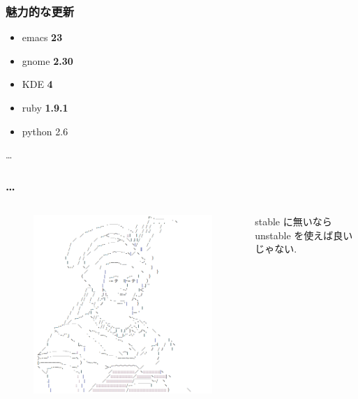 \documentclass[cjk,dvipdfmx,12pt,%
hyperref={bookmarks=true,bookmarksnumbered=true,bookmarksopen=false,%
colorlinks=false,%
pdftitle={野良ビルドから始めるパッケージ作成},%
pdfauthor={佐々木洋平},%
pdfsubject={第37回関西Debian勉強会 at OSC 2010 Kansai$@$kyoto},%
}]{beamer}
\begin{document}

\begin{frame}[fragile]
\frametitle{魅力的な更新}


\begin{itemize}
\item emacs \textbf{23}
\item gnome \textbf{2.30}
\item KDE \textbf{4}
\item ruby \textbf{1.9.1}
\item python 2.6
\end{itemize}

\dots{}

\end{frame}



\begin{frame}[fragile]
\frametitle{\dots{}}


\begin{columns}[t]
\column{0.45\paperwidth}
\begin{figure}[h!]
    \centering
    \includegraphics[width=1.05\textheight]{./image201007/AA-MarieAntoinette.png}
\end{figure}


\column{0.45\paperwidth}

\begin{center}
stable に無いなら unstable を使えば良いじゃない.
\end{center}

\end{columns}


\end{frame}
\end{document}
